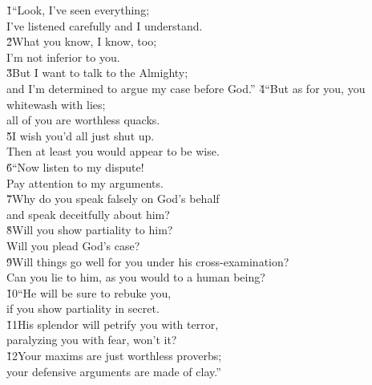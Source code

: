 \begin{poetry}
\poeml {}
\v{1}``Look, I've seen everything; \\
\poemll    I've listened carefully and I understand. \\
\poeml \v{2}What you know, I know, too; \\
\poemll    I'm not inferior to you. \\
\poeml \v{3}But I want to talk to the Almighty; \\
\poemll    and I'm determined to argue my case before God.''
\poeml \v{4}``But as for you, you whitewash with lies; \\
\poemll    all of you are worthless quacks. \\
\poeml \v{5}I wish you'd all just shut up. \\
\poemll    Then at least you would appear to be wise. \\
\poeml \v{6}``Now listen to my dispute! \\
\poemll    Pay attention to my arguments. \\
\poeml \v{7}Why do you speak falsely on God's behalf \\
\poemll    and speak deceitfully about him? \\
\poeml \v{8}Will you show partiality to him? \\
\poemll    Will you plead God's case? \\
\poeml \v{9}Will things go well for you under his cross-examination? \\
\poemll    Can you lie to him, as you would to a human being? \\
\poeml \v{10}``He will be sure to rebuke you, \\
\poemll    if you show partiality in secret. \\
\poeml \v{11}His splendor will petrify you with terror, \\
\poemll    paralyzing you with fear, won't it? \\
\poeml \v{12}Your maxims are just worthless proverbs; \\
\poemll    your defensive arguments are made of clay.''

\end{poetry}
